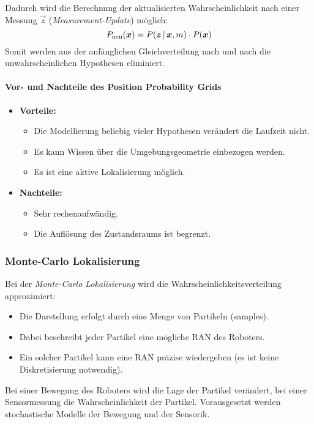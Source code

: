 					Dadurch wird die Berechnung der aktualisierten Wahrscheinlichkeit nach einer Messung \( \vec{z} \) (\emph{Measurement-Update}) möglich:
					\begin{equation*}
						P_\text{neu}(\bm{x}) = P(\bm{z} \,\vert\, \bm{x}, m) \cdot P(\bm{x})
					\end{equation*}
					Somit werden aus der anfänglichen Gleichverteilung nach und nach die unwahrscheinlichen Hypothesen eliminiert.

				\paragraph{Vor- und Nachteile des Position Probability Grids}
					\begin{itemize}
						\item \textbf{Vorteile:}
							\begin{itemize}
								\item Die Modellierung beliebig vieler Hypothesen verändert die Laufzeit nicht.
								\item Es kann Wissen über die Umgebungsgeometrie einbezogen werden.
								\item Es ist eine aktive Lokalisierung möglich.
							\end{itemize}
						\item \textbf{Nachteile:}
							\begin{itemize}
								\item Sehr rechenaufwändig.
								\item Die Auflösung des Zustandsraums ist begrenzt.
							\end{itemize}
					\end{itemize}

			\subsubsection{Monte-Carlo Lokalisierung}
				Bei der \emph{Monte-Carlo Lokalisierung} wird die Wahrscheinlichkeitsverteilung approximiert:
				\begin{itemize}
					\item Die Darstellung erfolgt durch eine Menge von Partikeln (samples).
					\item Dabei beschreibt jeder Partikel eine mögliche RAN des Roboters.
					\item Ein solcher Partikel kann eine RAN präzise wiedergeben (es ist keine Diskretisierung notwendig).
				\end{itemize}
				Bei einer Bewegung des Roboters wird die Lage der Partikel verändert, bei einer Sensormessung die Wahrscheinlichkeit der Partikel. Vorausgesetzt werden stochastische Modelle der Bewegung und der Sensorik.

